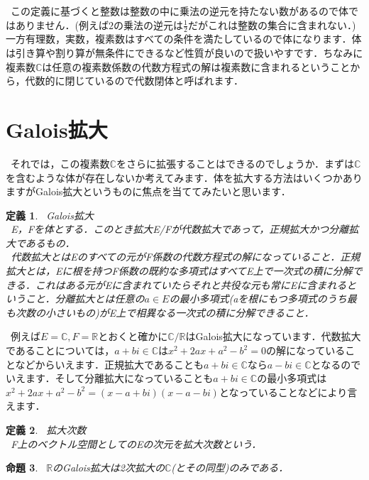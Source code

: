 \documentclass[./main]{subfiles} %
\theoremstyle{idefinition}
\newtheorem{idefi}{定義}[section]
\newtheorem{iprop}[idefi]{命題}
\begin{document}
\ この定義に基づくと整数は整数の中に乗法の逆元を持たない数があるので体ではありません．(例えば$2$の乗法の逆元は$\frac{1}{2}$だがこれは整数の集合に含まれない．)一方有理数，実数，複素数はすべての条件を満たしているので体になります．体は引き算や割り算が無条件にできるなど性質が良いので扱いやすです．ちなみに複素数$\mathbb{C}$は任意の複素数係数の代数方程式の解は複素数に含まれるということから，代数的に閉じているので代数閉体と呼ばれます．\\



\section{Galois拡大}
\ それでは，この複素数$\mathbb{C}$をさらに拡張することはできるのでしょうか．まずは$\mathbb{C}$を含むような体が存在しないか考えてみます．体を拡大する方法はいくつかありますがGalois拡大というものに焦点を当ててみたいと思います．\\

\begin{idefi}
\ Galois拡大\\
\ E，Fを体とする．このとき拡大E/Fが代数拡大であって，正規拡大かつ分離拡大であるもの．\\
\ 代数拡大とはEのすべての元がF係数の代数方程式の解になっていること．正規拡大とは，Eに根を持つF係数の既約な多項式はすべてE上で一次式の積に分解できる．これはある元がEに含まれていたらそれと共役な元も常にEに含まれるということ．分離拡大とは任意の$a \in E$の最小多項式(aを根にもつ多項式のうち最も次数の小さいもの)がE上で相異なる一次式の積に分解できること．
\end{idefi}

\ 例えば$E=\mathbb{C},F=\mathbb{R}$とおくと確かに$\mathbb{C}/\mathbb{R}$はGalois拡大になっています．代数拡大であることについては，$a+bi\in \mathbb{C}$は$x^2+2ax+a^2-b^2=0$の解になっていることなどからいえます．正規拡大であることも$a+bi\in \mathbb{C}$なら$a-bi\in \mathbb{C}$となるのでいえます．そして分離拡大になっていることも$a+bi\in \mathbb{C}$の最小多項式は$x^2+2ax+a^2-b^2=(x-a+bi)(x-a-bi)$となっていることなどにより言えます．\\


\begin{idefi}
\ 拡大次数\\
\ F上のベクトル空間としてのEの次元を拡大次数という．\\
\end{idefi}



\begin{iprop}
\ $\mathbb{R}$のGalois拡大は2次拡大の$\mathbb{C}$(とその同型)のみである．\\
\end{iprop}
\end{document}
